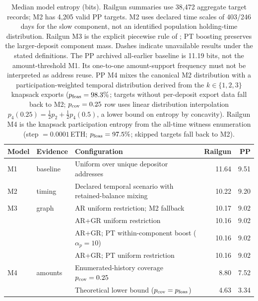 \begin{table}[t]
\centering\small\setlength{\tabcolsep}{5pt}\renewcommand{\arraystretch}{1.12}
\begin{tabular}{@{}ll p{5.5cm} rr@{}}
\toprule
Model & Evidence & Configuration & Railgun & PP\\
\midrule
M1 & baseline & Uniform over unique depositor addresses & 11.64 & 9.51\\
M2 & timing & Declared temporal scenario with retained-balance mixing & 10.22 & 9.20\\
M3 & graph & AR uniform restriction; M2 fallback & 10.17 & 9.02\\
 & & AR+GR uniform restriction & 10.16 & 9.02\\
 & & AR+GR; PT within-component boost ($\alpha_p=10$) & 10.16 & 9.02\\
 & & AR+GR; PT uniform restriction & 10.16 & 9.02\\
M4 & amounts & Enumerated-history coverage $p_{\rm cov}=0.25$ & 8.80 & 7.52\\
 & & Theoretical lower bound ($p_{\rm cov}=p_{\rm feas}$) & 4.63 & 3.34\\
\bottomrule
\end{tabular}
\caption{Median model entropy (bits). Railgun summaries use 38,472
aggregate target records; M2 has 4,205 valid PP targets.
M2 uses declared time scales of 403/246 days for the slow component,
not an identified population holding-time distribution.
Railgun M3 is the explicit piecewise rule of ;
PT boosting preserves the larger-deposit component mass.
Dashes indicate unavailable results under the stated definitions.
The PP archived all-earlier baseline is 11.19 bits,
not the amount-threshold M1. Its one-to-one amount-support frequency
must not be interpreted as address reuse.
PP M4 mixes the canonical M2 distribution with a participation-weighted
temporal distribution derived from the $k\in\{1,2,3\}$ knapsack exports
($p_{\rm feas}=98.3\%$; targets without per-deposit export data fall back to M2;
$p_{\rm cov}=0.25$ row uses linear distribution interpolation
$p_4(0.25)=\tfrac{1}{2}p_2+\tfrac{1}{2}p_4(0.5)$, a lower bound on entropy by concavity).
Railgun M4 is the knapsack participation entropy from the all-time
witness enumeration (step $=0.0001$\,ETH; $p_{\rm feas}=97.5\%$;
skipped targets fall back to M2).}
\label{tab:entropy_model_numeric}
\end{table}
